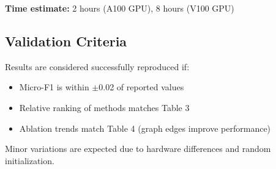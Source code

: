 \textbf{Time estimate:} 2 hours (A100 GPU), 8 hours (V100 GPU)

\subsection{Validation Criteria}

Results are considered successfully reproduced if:
\begin{itemize}
    \item Micro-F1 is within $\pm$0.02 of reported values
    \item Relative ranking of methods matches Table 3
    \item Ablation trends match Table 4 (graph edges improve performance)
\end{itemize}

Minor variations are expected due to hardware differences and random initialization.
